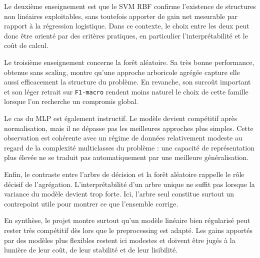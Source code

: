 Le deuxième enseignement est que le SVM RBF confirme l'existence de structures non linéaires exploitables, sans toutefois apporter de gain net mesurable par rapport à la régression logistique. Dans ce contexte, le choix entre les deux peut donc être orienté par des critères pratiques, en particulier l'interprétabilité et le coût de calcul.

Le troisième enseignement concerne la forêt aléatoire. Sa très bonne performance, obtenue sans scaling, montre qu'une approche arboricole agrégée capture elle aussi efficacement la structure du problème. En revanche, son surcoût important et son léger retrait sur \texttt{F1-macro} rendent moins naturel le choix de cette famille lorsque l'on recherche un compromis global.

Le cas du MLP est également instructif. Le modèle devient compétitif après normalisation, mais il ne dépasse pas les meilleures approches plus simples. Cette observation est cohérente avec un régime de données relativement modeste au regard de la complexité multiclasses du problème : une capacité de représentation plus élevée ne se traduit pas automatiquement par une meilleure généralisation.

Enfin, le contraste entre l'arbre de décision et la forêt aléatoire rappelle le rôle décisif de l'agrégation. L'interprétabilité d'un arbre unique ne suffit pas lorsque la variance du modèle devient trop forte. Ici, l'arbre seul constitue surtout un contrepoint utile pour montrer ce que l'ensemble corrige.

En synthèse, le projet montre surtout qu'un modèle linéaire bien régularisé peut rester très compétitif dès lors que le preprocessing est adapté. Les gains apportés par des modèles plus flexibles restent ici modestes et doivent être jugés à la lumière de leur coût, de leur stabilité et de leur lisibilité.

